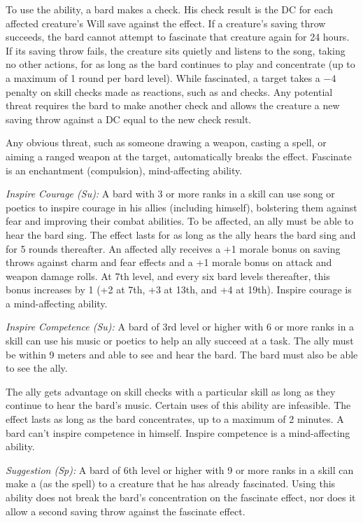 To use the ability, a bard makes a  check. His check result is the DC for each affected creature's Will save against the effect. If a creature's saving throw succeeds, the bard cannot attempt to fascinate that creature again for 24 hours. If its saving throw fails, the creature sits quietly and listens to the song, taking no other actions, for as long as the bard continues to play and concentrate (up to a maximum of 1 round per bard level). While fascinated, a target takes a $-4$ penalty on skill checks made as reactions, such as  and  checks. Any potential threat requires the bard to make another  check and allows the creature a new saving throw against a DC equal to the new  check result.

Any obvious threat, such as someone drawing a weapon, casting a spell, or aiming a ranged weapon at the target, automatically breaks the effect. Fascinate is an enchantment (compulsion), mind-affecting ability.

\textit{Inspire Courage (Su):} A bard with 3 or more ranks in a  skill can use song or poetics to inspire courage in his allies (including himself), bolstering them against fear and improving their combat abilities. To be affected, an ally must be able to hear the bard sing. The effect lasts for as long as the ally hears the bard sing and for 5 rounds thereafter. An affected ally receives a +1 morale bonus on saving throws against charm and fear effects and a +1 morale bonus on attack and weapon damage rolls. At 7th level, and every six bard levels thereafter, this bonus increases by 1 (+2 at 7th, +3 at 13th, and +4 at 19th). Inspire courage is a mind-affecting ability.

\textit{Inspire Competence (Su):} A bard of 3rd level or higher with 6 or more ranks in a  skill can use his music or poetics to help an ally succeed at a task. The ally must be within 9 meters and able to see and hear the bard. The bard must also be able to see the ally.

The ally gets advantage on skill checks with a particular skill as long as they continue to hear the bard's music. Certain uses of this ability are infeasible. The effect lasts as long as the bard concentrates, up to a maximum of 2 minutes. A bard can't inspire competence in himself. Inspire competence is a mind-affecting ability.

\textit{Suggestion (Sp):} A bard of 6th level or higher with 9 or more ranks in a  skill can make a  (as the spell) to a creature that he has already fascinated. Using this ability does not break the bard's concentration on the fascinate effect, nor does it allow a second saving throw against the fascinate effect.

